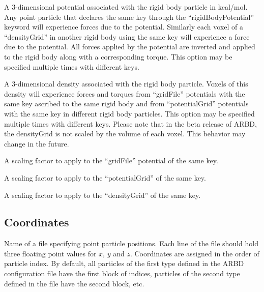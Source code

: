 \documentclass[10pt]{article}
\begin{document}
{A 3-dimensional potential associated with the rigid body particle in kcal/mol.
Any point particle that declares the same key through the ``rigidBodyPotential'' keyword will experience forces due to the potential.
Similarly each voxel of a ``densityGrid'' in another rigid body using the same key will experience a force due to the potential.
All forces applied by the potential are inverted and applied to the rigid body along with a corresponding torque.
This option may be specified multiple times with different keys.
}

{A 3-dimensional density associated with the rigid body particle. 
Voxels of this density will experience forces and torques from ``gridFile'' potentials with the same key ascribed to the same rigid body and from ``potentialGrid'' potentials with the same key in different rigid body particles.
This option may be specified multiple times with different keys.
Please note that in the beta release of ARBD, the densityGrid is not scaled by the volume of each voxel. This behavior may change in the future.
}

{A scaling factor to apply to the ``gridFile'' potential of the same key.}

{A scaling factor to apply to the ``potentialGrid'' of the same key.}

{A scaling factor to apply to the ``densityGrid'' of the same key.}



\subsection{Coordinates}


{Name of a file specifying point particle positions. 
Each line of the file should hold three floating point values for $x$, $y$ and $z$.
Coordinates are assigned in the order of particle index.
By default, all particles of the first type defined in the ARBD configuration file have the first block of indices, particles of the second type defined in the file have the second block, etc.
}
\end{document}

